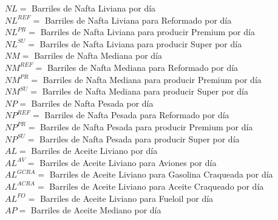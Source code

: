 \documentclass[a4paper,10pt]{article}
\begin{document}
$NL = $ Barriles de Nafta Liviana por d\'ia \\

$NL^{REF} = $ Barriles de Nafta Liviana para Reformado por d\'ia \\

$NL^{PR} = $ Barriles de Nafta Liviana para producir Premium por d\'ia \\

$NL^{SU} = $ Barriles de Nafta Liviana para producir Super por d\'ia \\

$NM = $ Barriles de Nafta Mediana por d\'ia \\

$NM^{REF} = $ Barriles de Nafta Mediana para Reformado por d\'ia \\

$NM^{PR} = $ Barriles de Nafta Mediana para producir Premium por d\'ia \\

$NM^{SU} = $ Barriles de Nafta Mediana para producir Super por d\'ia \\

$NP = $ Barriles de Nafta Pesada por d\'ia \\

$NP^{REF} = $ Barriles de Nafta Pesada para Reformado por d\'ia \\

$NP^{PR} = $ Barriles de Nafta Pesada para producir Premium por d\'ia \\

$NP^{SU} = $ Barriles de Nafta Pesada para producir Super por d\'ia \\

$AL = $ Barriles de Aceite Liviano por d\'ia \\

$AL^{AV} = $ Barriles de Aceite Liviano para Aviones por d\'ia \\

$AL^{GCRA} = $ Barriles de Aceite Liviano para Gasolina Craqueada por d\'ia \\

$AL^{ACRA} = $ Barriles de Aceite Liviano para Aceite Craqueado por d\'ia \\

$AL^{FO} = $ Barriles de Aceite Liviano para Fueloil por d\'ia \\

$AP = $ Barriles de Aceite Mediano por d\'ia \\
\end{document}
